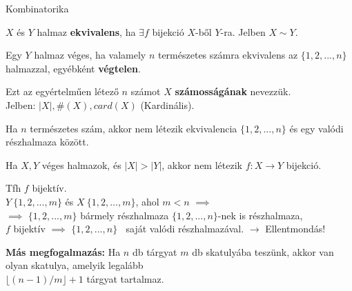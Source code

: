 \begin{frame}[plain]
\begin{tcolorbox}[center, colback={myyellow}, coltext={black}, colframe={myyellow}]
    {\Huge Kombinatorika}
    \mmedskip
\end{tcolorbox}
\end{frame}


\begin{frame}
  \begin{tcolorbox}[title={Def.: Halmazok ekvivalenciája}]
    $X$ és $Y$ halmaz \textbf{ekvivalens}, ha ${\exists} f$ bijekció $X$-ből $Y$-ra. Jelben $X \sim Y$.\\
    \mmedskip

    Egy $Y$ halmaz véges, ha valamely $n$ természetes számra ekvivalens az $\{ 1, 2, ..., n \}$ halmazzal, egyébként \textbf{végtelen}.\\
    \mmedskip

    Ezt az egyértelműen létező $n$ számot $X$ \textbf{számosságának} nevezzük.\\
    Jelben: $|X|, \#(X), card(X)$ (Kardinális).
  \end{tcolorbox}

  \begin{tcolorbox}[title={Tétel: Véges halmaz valódi részhalmaza}]
    Ha $n$ természetes szám, akkor nem létezik ekvivalencia $\{ 1, 2, ..., n \}$ és egy valódi részhalmaza között.
  \end{tcolorbox}
\end{frame}

\begin{frame}
  \begin{tcolorbox}[title={Tétel: Skatulya-elv}]
    Ha $X, Y$ véges halmazok, és $|X| > |Y|$, akkor nem létezik $f: X \rightarrow Y$ bijekció.
  \end{tcolorbox}

  \begin{tcolorbox}[title={Bizonyítás (Indirekt)}]
    Tfh $f$ bijektív.\\
    $Y ~ \{1, 2, ..., m\}$ és $X ~ \{1, 2, ..., m\}$, ahol $m < n$ $\implies$\\
    $\implies$ $\{1, 2, ..., m\}$ bármely részhalmaza $\{1, 2, ..., n\}$-nek is részhalmaza,\\
    $f$ bijektív $\implies$ $\{1, 2, ..., n\}$ $~$ saját valódi részhalmazával. $\rightarrow$ Ellentmondás!\\
    \bigskip

    \textbf{Más megfogalmazás:} Ha $n$ db tárgyat $m$ db skatulyába teszünk, akkor van olyan skatulya, amelyik legalább\\
    $\lfloor (n - 1) / m \rfloor + 1$ tárgyat tartalmaz.
  \end{tcolorbox}
\end{frame}

